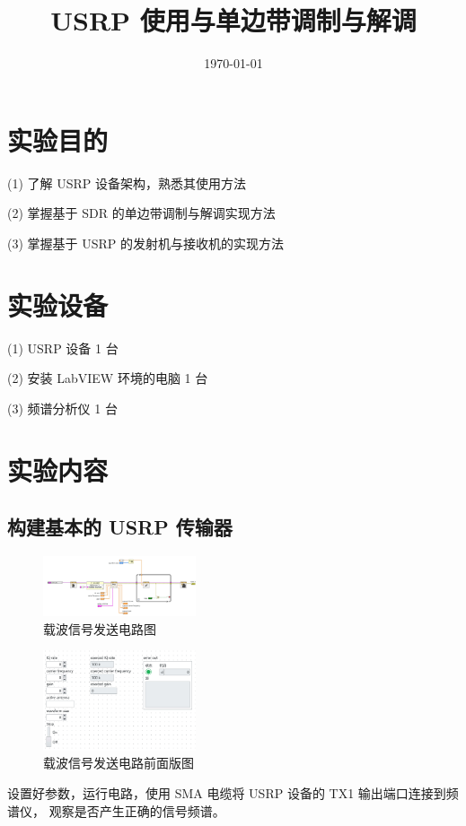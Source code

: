 \documentclass{../source/Experiment}
\title{USRP 使用与单边带调制与解调}
\date{\today}
\begin{document}
    \makecover
    \makeheader
    \section{实验目的}
    (1) 了解 USRP 设备架构，熟悉其使用方法 
    
    (2) 掌握基于 SDR 的单边带调制与解调实现方法 
    
    (3) 掌握基于 USRP 的发射机与接收机的实现方法
    \section{实验设备}
    
    (1) USRP 设备 1 台 
    
    (2) 安装 LabVIEW 环境的电脑 1 台 
    
    (3) 频谱分析仪 1 台


    \section{实验内容}
        \subsection{构建基本的 USRP 传输器}
        \begin{figure}[H]
            \centering
            \includegraphics[width = 0.4\textwidth]{lab9/carrier.jpg}
            \caption{载波信号发送电路图}
        \end{figure}
        \begin{figure}[H]
            \centering
            \includegraphics[width = 0.4\textwidth]{lab9/carrier-b.jpg}
            \caption{载波信号发送电路前面版图}
        \end{figure}

        设置好参数，运行电路，使用 SMA 电缆将 USRP 设备的 TX1 输出端口连接到频谱仪， 观察是否产生正确的信号频谱。
\end{document}

